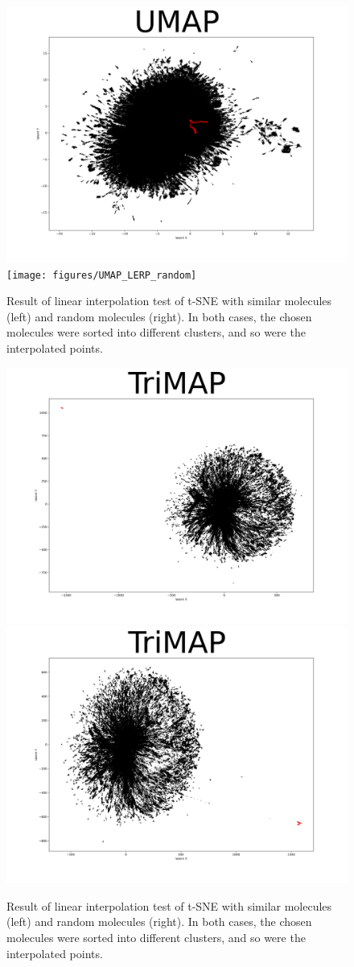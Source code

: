 \begin{figure}
	\centering
	\includegraphics[width=0.5\columnwidth]{figures/UMAP_LERP_coxib}
	\texttt{[image: figures/UMAP\_LERP\_random]}
	\caption{Result of linear interpolation test of t-SNE with similar molecules (left) and random molecules (right). In both cases, the chosen molecules were sorted into different clusters, and so were the interpolated points.}
	\label{fig:umap:lerp}
\end{figure}

\begin{figure}
	\centering
	\includegraphics[width=0.5\columnwidth]{figures/TriMAP_LERP_coxib}
	\includegraphics[width=0.5\columnwidth]{figures/TriMAP_LERP_random}
	\caption{Result of linear interpolation test of t-SNE with similar molecules (left) and random molecules (right). In both cases, the chosen molecules were sorted into different clusters, and so were the interpolated points.}
	\label{fig:trimap:lerp}
\end{figure}

